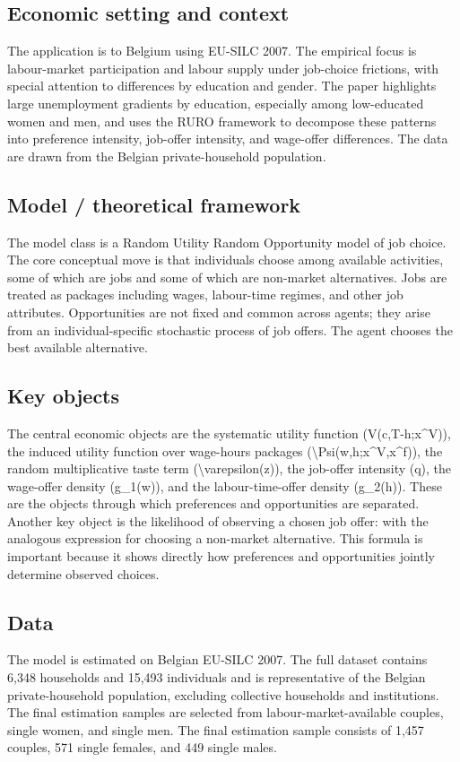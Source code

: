 \documentclass[11pt,a4paper]{article}
\begin{document}
\subsection*{Economic setting and context}
The application is to Belgium using EU-SILC 2007. The empirical focus is labour-market participation and labour supply under job-choice frictions, with special attention to differences by education and gender. The paper highlights large unemployment gradients by education, especially among low-educated women and men, and uses the RURO framework to decompose these patterns into preference intensity, job-offer intensity, and wage-offer differences. The data are drawn from the Belgian private-household population.

\subsection*{Model / theoretical framework}
The model class is a Random Utility Random Opportunity model of job choice. The core conceptual move is that individuals choose among available activities, some of which are jobs and some of which are non-market alternatives. Jobs are treated as packages including wages, labour-time regimes, and other job attributes. Opportunities are not fixed and common across agents; they arise from an individual-specific stochastic process of job offers. The agent chooses the best available alternative.

\subsection*{Key objects}
The central economic objects are the systematic utility function (V(c,T-h;x\textasciicircum{}V)), the induced utility function over wage-hours packages (\textbackslash{}Psi(w,h;x\textasciicircum{}V,x\textasciicircum{}f)), the random multiplicative taste term (\textbackslash{}varepsilon(z)), the job-offer intensity (q), the wage-offer density (g\_1(w)), and the labour-time-offer density (g\_2(h)). These are the objects through which preferences and opportunities are separated. Another key object is the likelihood of observing a chosen job offer: with the analogous expression for choosing a non-market alternative. This formula is important because it shows directly how preferences and opportunities jointly determine observed choices.

\subsection*{Data}
The model is estimated on Belgian EU-SILC 2007. The full dataset contains 6,348 households and 15,493 individuals and is representative of the Belgian private-household population, excluding collective households and institutions. The final estimation samples are selected from labour-market-available couples, single women, and single men. The final estimation sample consists of 1,457 couples, 571 single females, and 449 single males.
\end{document}
